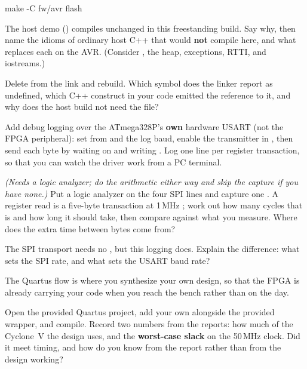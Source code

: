 \begin{shell}
make -C fw/avr flash
\end{shell}

 The host demo () compiles unchanged in this freestanding build.
Say why, then name the idioms of ordinary host C++ that would \textbf{not} compile here, and what
replaces each on the AVR. (Consider , the heap, exceptions, RTTI, and iostreams.)

 Delete  from the link and rebuild. Which symbol does the linker report as
undefined, which C++ construct in your code emitted the reference to it, and why does the host build
not need the file?

\label{c9:ex:3}

 Add debug logging over the ATmega328P's \textbf{own} hardware USART (not the FPGA
peripheral): set  from  and the log baud, enable the transmitter in
, then send each byte by waiting on  and writing
. Log one line per register transaction, so that you can watch the driver work from a PC
terminal.

 \emph{(Needs a logic analyzer; do the arithmetic either way and skip the capture if you
have none.)} Put a logic analyzer on the four SPI lines and capture one . A register
read is a five-byte transaction at 1\,MHz ; work out how many  cycles that is
and how long it should take, then compare against what you measure. Where does the extra time
between bytes come from?

 The SPI transport needs no , but this logging does. Explain the difference:
what sets the SPI  rate, and what sets the USART baud rate?

\label{c9:ex:4}
The Quartus flow is where you synthesize your own design, so that the FPGA is already carrying your
code when you reach the bench rather than on the day.

 Open the provided Quartus project, add your own  alongside the provided
 wrapper, and compile. Record two numbers from the reports: how much of the
Cyclone~V the design uses, and the \textbf{worst-case slack} on the 50\,MHz clock. Did it meet
timing, and how do you know from the report rather than from the design working?


